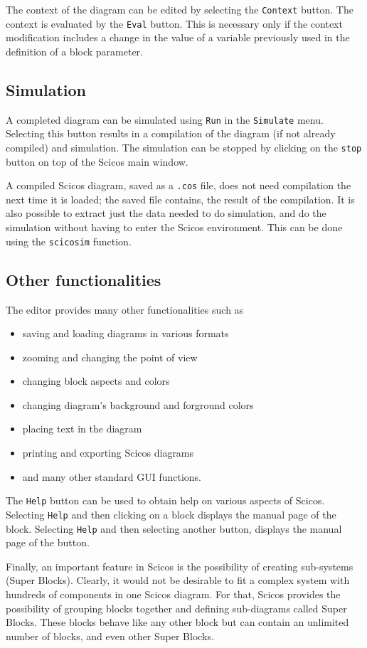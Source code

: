 \documentclass{article}
\begin{document}
The context of the diagram can be edited by selecting the {\tt Context} button.
The context is evaluated by the {\tt Eval} button. This is necessary only if the
context modification includes a change in the value of a variable previously used in the
definition of a block parameter.

\subsection{Simulation}
A completed diagram can be simulated using {\tt Run} in the
{\tt Simulate} menu. Selecting this button results in a compilation
of the diagram (if not already compiled) and simulation.
The simulation can be stopped by clicking on the {\tt stop} button on
top of the Scicos main window. 


A compiled Scicos diagram, saved as a {\tt *.cos} file, 
does not need compilation the next time it is loaded; the saved file contains, the
result of the compilation. It is also possible to 
extract just the data needed to do simulation, and do the simulation
without having to enter the Scicos environment. This can be done
using the {\tt scicosim} function.


\subsection{Other functionalities}
The editor provides many other functionalities such as
\begin{itemize}
\item saving and loading diagrams in various formats
\item zooming and changing the point of view
\item changing block aspects and colors
\item changing diagram's background and forground colors
\item placing text in the diagram
\item printing and exporting Scicos diagrams
\item and many other standard GUI functions.
\end{itemize}
The {\tt Help} button can be used to obtain help on various aspects of Scicos.
Selecting {\tt Help} and then clicking on a block displays the manual page of the block.
Selecting {\tt Help} and then selecting another button, displays the manual page of the button.


Finally, an important feature in Scicos is the possibility of creating sub-systems (Super Blocks).
Clearly, it would not be desirable to fit a complex system with hundreds of
components in one Scicos diagram. For that, Scicos provides the possibility
of grouping blocks together and defining sub-diagrams called Super Blocks.
These blocks behave like any other block but can contain
an unlimited number of blocks, and even other Super Blocks. 
\end{document}
